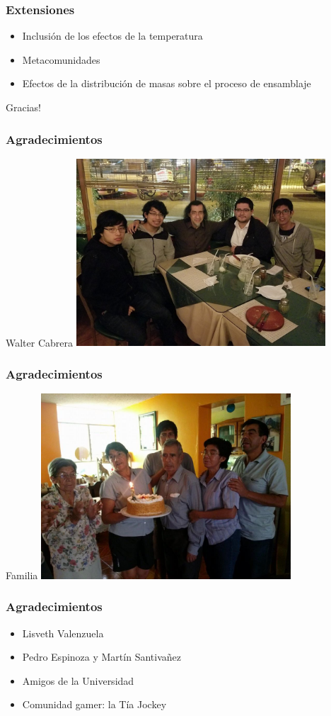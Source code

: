 \documentclass[11 pt,t]{beamer}
\begin{document}
\begin{frame}
  \frametitle{Extensiones}
  \Large
  \begin{itemize}
  \item Inclusi\'on de los efectos de la temperatura
  \item Metacomunidades
  \item Efectos de la distribuci\'on de masas sobre el proceso de ensamblaje
  \end{itemize}
\end{frame}
\begin{frame}
  \vspace{1 in}
  \begin{center}
    \Huge Gracias!
  \end{center}
\end{frame}
\begin{frame}
  \frametitle{Agradecimientos}
  \Large Walter Cabrera
  \centering
  \includegraphics[width = 0.7\textwidth]{Pics/walter.jpg}
\end{frame}
\begin{frame}
  \frametitle{Agradecimientos}
  \Large Familia
  \centering
  \includegraphics[width = 0.7\textwidth]{Pics/familia.jpg}
\end{frame}

\begin{frame}
  \frametitle{Agradecimientos}
  \begin{itemize}
  \item Lisveth Valenzuela
  \item Pedro Espinoza y Mart\'in Santiva\~nez
  \item Amigos de la Universidad
  \item Comunidad gamer: la T\'ia Jockey
  \end{itemize}
\end{frame}
\end{document}
